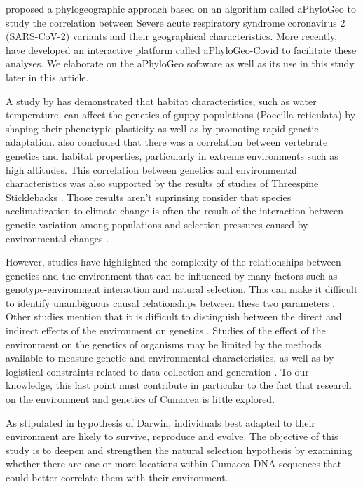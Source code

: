 \cite{koshkarov_phylogeography_2022} proposed a phylogeographic approach based on an algorithm called aPhyloGeo to study the correlation between Severe acute respiratory syndrome coronavirus 2 (SARS-CoV-2) variants and their geographical characteristics. More recently, \cite{li_aphylogeo-covid_2023} have developed an interactive platform called aPhyloGeo-Covid to facilitate these analyses.  We elaborate on the aPhyloGeo software as well as its use in this study later in this article.

A study by \cite{ghalambor_adaptive_2007} has demonstrated that habitat characteristics, such as water temperature, can affect the genetics of guppy populations (Poecilla reticulata) by shaping their phenotypic plasticity as well as by promoting rapid genetic adaptation. \cite{cheviron_genomic_2012} also concluded that there was a correlation between vertebrate genetics and habitat properties, particularly in extreme environments such as high altitudes. This correlation between genetics and environmental characteristics was also supported by the results of studies of Threespine Sticklebacks \citep{fc_genomic_2012}. Those results aren't suprinsing consider that species acclimatization to climate change is often the result of the interaction between genetic variation among populations and selection pressures caused by environmental changes \citep{hoffmann_climate_2011}.

However, studies have highlighted the complexity of the relationships between genetics and the environment that can be influenced by many factors such as genotype-environment interaction and natural selection. This can make it difficult to identify unambiguous causal relationships between these two parameters \citep{manel_perspectives_2010}. Other studies mention that it is difficult to distinguish between the direct and indirect effects of the environment on genetics \citep{manel_perspectives_2010, balkenhol_landscape_2019}. Studies of the effect of the environment on the genetics of organisms may be limited by the methods available to measure genetic and environmental characteristics, as well as by logistical constraints related to data collection and generation \citep{manel_perspectives_2010, shafer_widespread_2013}. To our knowledge, this last point must contribute in particular to the fact that research on the environment and genetics of Cumacea is little explored.

As stipulated in hypothesis of Darwin, individuals best adapted to their environment are likely to survive, reproduce and evolve. The objective of this study is to deepen and strengthen the natural selection hypothesis by examining whether there are one or more locations within Cumacea DNA sequences that could better correlate them with their environment.


